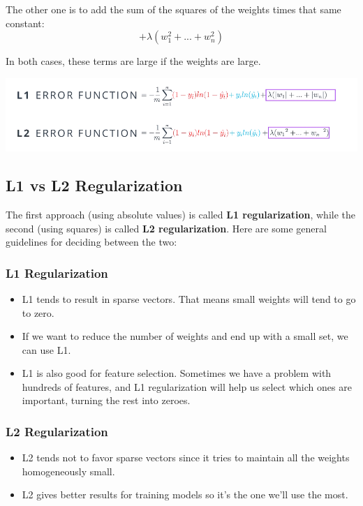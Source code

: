 The other one is to add the sum of the squares of the weights times that same constant: \[+ \lambda (w_1^2 + ... + w_n^2)\]

In both cases, these terms are large if the weights are large.

\includegraphics[width=1\linewidth]{img//intro//trainingNN/training-considerations-9.png}

\subsection{L1 vs L2 Regularization}

The first approach (using absolute values) is called \textbf{L1 regularization}, while the second (using squares) is called \textbf{L2 regularization}. Here are some general guidelines for deciding between the two:

\subsubsection{L1 Regularization}

\begin{itemize}
    \item L1 tends to result in sparse vectors. That means small weights will tend to go to zero.
    \item If we want to reduce the number of weights and end up with a small set, we can use L1.
    \item L1 is also good for feature selection. Sometimes we have a problem with hundreds of features, and L1 regularization will help us select which ones are important, turning the rest into zeroes.
\end{itemize}

\subsubsection{L2 Regularization}

\begin{itemize}
    \item L2 tends not to favor sparse vectors since it tries to maintain all the weights homogeneously small.
    \item L2 gives better results for training models so it's the one we'll use the most.
\end{itemize}

